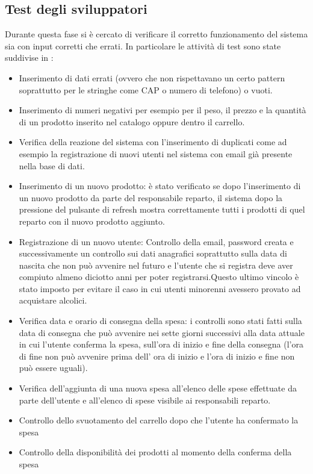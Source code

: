 \documentclass{article}
\begin{document}
\subsection{Test degli sviluppatori}
Durante questa fase si è cercato di verificare il corretto funzionamento del sistema sia con input corretti che errati. In particolare le attività di test sono state suddivise in :
\begin{itemize}
    \item Inserimento di dati errati (ovvero che non rispettavano un certo pattern soprattutto per le stringhe come CAP o numero di telefono) o vuoti. 
    \item Inserimento di numeri negativi per esempio per il peso, il prezzo e la quantità di un prodotto inserito nel catalogo oppure dentro il carrello.
    \item Verifica della reazione del sistema con l'inserimento di duplicati come ad esempio la registrazione di nuovi utenti nel sistema con email già presente nella base di dati.
    \item Inserimento di un nuovo prodotto: è stato verificato se dopo l'inserimento di un nuovo prodotto da parte del responsabile reparto, il sistema dopo la pressione del pulsante di refresh mostra correttamente tutti i prodotti di quel reparto con il nuovo prodotto aggiunto.
    \item Registrazione di un nuovo utente: Controllo della email, password creata e successivamente un controllo sui dati anagrafici soprattutto sulla data di nascita che non può avvenire nel futuro e l'utente che si registra deve aver compiuto almeno diciotto anni per poter registrarsi.Questo ultimo vincolo è stato imposto per evitare il caso in cui utenti minorenni avessero provato ad acquistare alcolici.
    \item Verifica data e orario di consegna della spesa: i controlli sono stati fatti sulla data di consegna che può avvenire nei sette giorni successivi alla data attuale in cui l'utente conferma la spesa, sull'ora di inizio e fine della consegna (l'ora di fine non può avvenire prima dell' ora di inizio e l'ora di inizio e fine non può essere uguali).
    \item Verifica dell'aggiunta di una nuova spesa all'elenco delle spese effettuate da parte dell'utente e all'elenco di spese visibile ai responsabili reparto. 
    \item Controllo dello svuotamento del carrello dopo che l'utente ha confermato la spesa
    \item Controllo della disponibilità dei prodotti al momento della conferma della spesa

\end{itemize}
\end{document}
